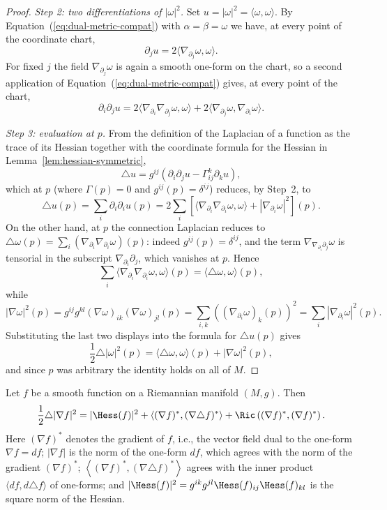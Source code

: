 \begin{proof}
\emph{Step 2: two differentiations of $|\omega|^2$.} Set
$u=|\omega|^2=\langle\omega,\omega\rangle$. By
Equation~(\ref{eq:dual-metric-compat}) with $\alpha=\beta=\omega$ we
have, at every point of the coordinate chart,
$$\partial_ju=2\langle\nabla_{\partial_j}\omega,\omega\rangle .$$
For fixed $j$ the field $\nabla_{\partial_j}\omega$ is again a smooth
one-form on the chart, so a second application of
Equation~(\ref{eq:dual-metric-compat}) gives, at every point of the
chart,
$$\partial_i\partial_ju
=2\langle\nabla_{\partial_i}\nabla_{\partial_j}\omega,\omega\rangle
+2\langle\nabla_{\partial_j}\omega,\nabla_{\partial_i}\omega\rangle .$$

\emph{Step 3: evaluation at $p$.} From the definition of the Laplacian of
a function as the trace of its Hessian together with the coordinate
formula for the Hessian in Lemma~\ref{lem:hessian-symmetric},
$$\triangle u
=g^{ij}\left(\partial_i\partial_ju-\Gamma^k_{ij}\partial_ku\right),$$
which at $p$ (where $\Gamma(p)=0$ and $g^{ij}(p)=\delta^{ij}$) reduces,
by Step~2, to
$$\triangle u(p)=\sum_i\partial_i\partial_iu(p)
=2\sum_i\left[\langle\nabla_{\partial_i}\nabla_{\partial_i}\omega,
\omega\rangle+|\nabla_{\partial_i}\omega|^2\right](p).$$
On the other hand, at $p$ the connection Laplacian reduces to
$\triangle\omega(p)
=\sum_i\left(\nabla_{\partial_i}\nabla_{\partial_i}\omega\right)(p)$:
indeed $g^{ij}(p)=\delta^{ij}$, and the term
$\nabla_{\nabla_{\partial_i}\partial_j}\omega$ is tensorial in the
subscript $\nabla_{\partial_i}\partial_j$, which vanishes at $p$. Hence
$$\sum_i\langle\nabla_{\partial_i}\nabla_{\partial_i}\omega,\omega\rangle(p)
=\langle\triangle\omega,\omega\rangle(p),$$
while
$$|\nabla\omega|^2(p)
=g^{ij}g^{kl}(\nabla\omega)_{ik}(\nabla\omega)_{jl}(p)
=\sum_{i,k}\left((\nabla_{\partial_i}\omega)_k(p)\right)^2
=\sum_i|\nabla_{\partial_i}\omega|^2(p).$$
Substituting the last two displays into the formula for $\triangle u(p)$
gives
$$\frac12\triangle|\omega|^2(p)
=\langle\triangle\omega,\omega\rangle(p)+|\nabla\omega|^2(p),$$
and since $p$ was arbitrary the identity holds on all of $M$.
\end{proof}

\begin{lemma}
\label{lem:function-bochner-formula}
\leanok
Let $f$ be a smooth function on a Riemannian manifold $(M,g)$. Then
$$\frac{1}{2}\triangle|\nabla f|^2
=|\Hess(f)|^2
+\left\langle(\nabla f)^*,(\nabla\triangle f)^*\right\rangle
+\Ric\left((\nabla f)^*,(\nabla f)^*\right).$$
Here $(\nabla f)^*$ denotes the gradient of $f$, i.e., the vector field
dual to the one-form $\nabla f=df$; $|\nabla f|$ is the norm of the
one-form $df$, which agrees with the norm of the gradient $(\nabla f)^*$;
$\left\langle(\nabla f)^*,(\nabla\triangle f)^*\right\rangle$ agrees with
the inner product $\langle df,d\triangle f\rangle$ of one-forms; and
$|\Hess(f)|^2=g^{ik}g^{jl}\Hess(f)_{ij}\Hess(f)_{kl}$ is the square norm
of the Hessian.
\end{lemma}


